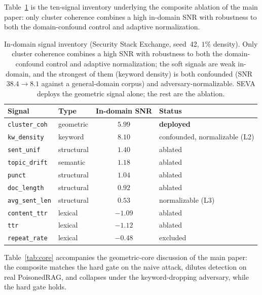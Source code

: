 \documentclass[10pt,journal,compsoc]{IEEEtran}
\begin{document}
Table~\ref{tab:signals} is the ten-signal inventory underlying the composite ablation of the
main paper: only cluster coherence combines a high in-domain SNR with robustness to both the
domain-confound control and adaptive normalization.

\begin{table}[H]
\centering
\caption{In-domain signal inventory (Security Stack Exchange, seed~42, $1\%$
density). Only cluster coherence combines a high SNR with robustness to both the
domain-confound control and adaptive normalization; the soft signals are weak
in-domain, and the strongest of them (keyword density) is both confounded
(SNR~$38.4\!\to\!8.1$ against a general-domain corpus) and adversary-normalizable.
SEVA deploys the geometric signal alone; the rest are the ablation.}
\label{tab:signals}
\setlength{\tabcolsep}{4pt}
\begin{tabular}{llc>{\raggedright\arraybackslash}p{2.1cm}}
\toprule
Signal & Type & In-domain SNR & Status \\
\midrule
\texttt{cluster\_coh}  & geometric  & $5.99$  & \textbf{deployed} \\
\texttt{kw\_density}   & keyword    & $8.10$  & confounded, normalizable (L2) \\
\texttt{sent\_unif}    & structural & $1.40$  & ablated \\
\texttt{topic\_drift}  & semantic   & $1.18$  & ablated \\
\texttt{punct}         & structural & $1.04$  & ablated \\
\texttt{doc\_length}   & structural & $0.92$  & ablated \\
\texttt{avg\_sent\_len} & structural & $0.53$  & normalizable (L3) \\
\texttt{content\_ttr}  & lexical    & $-1.09$ & ablated \\
\texttt{ttr}           & lexical    & $-1.12$ & ablated \\
\texttt{repeat\_rate}  & lexical    & $-0.48$ & excluded \\
\bottomrule
\end{tabular}
\end{table}

Table~\ref{tab:core} accompanies the geometric-core discussion of the main paper: the composite
matches the hard gate on the naive attack, dilutes detection on real PoisonedRAG, and collapses
under the keyword-dropping adversary, while the hard gate holds.
\end{document}
